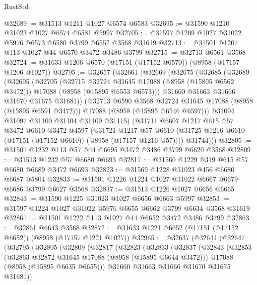 \begin{lexlean}{RustStd}
\begin{coremodule}
@32689 := @31513 @1211 @1027 @6574 @6583
@32695 := @31590 @1210 @31023 @1027 @6574 @6581 @5997
@32705 := @31597 @1209 @1027 @31022 @5976 @6573 @6580 @3799 @6552 @3568 @31619
@32713 := @31501 @1207 @113 @1027 @44 @6570 @3472 @3486 @3799
@32715 := @32713 @6561 @3568
@32724 := @31633 @1206 @6570 (@17151 (@17152 @6570)) (@8958 (@17157 @1206 @1027))
@32795 := @32657
    (@32661
      (@32669
        (@32675
          (@32685
            (@32689
              (@32695
                (@32705
                  (@32715 @32724 @31645 @17088 (@8958 (@15895 @6562 @3472)))
                  @17088
                  (@8958 (@15895 @6553 @6573)))
                @31660
                @31663
                @31666
                @31670
                @31675
                @31681))
            (@32713 @6590 @3568 @32724 @31645 @17088 (@8958 (@15895 @6591 @3472)))
            @17088
            (@8958 (@15895 @6546 @6597)))
          @31094
          @31097
          @31100
          @31104
          @31109
          @31115)
        (@31711
          @6607
          @1217
          @615
          @57
          @3472
          @6610
          @3472
          @4597
          (@31721
            @1217
            @57
            @6610
            (@31725 @1216 @6610 (@17151 (@17152 @6610)) (@8958 (@17157 @1216 @57))))
          @31744)))
@32805 := @31501 @1232 @113 @57 @44 @6695 @3472 @3486 @3799 @6620 @3568
@32809 := @31513 @1232 @57 @6680 @6693
@32817 := @31560 @1229 @319 @615 @57 @6680 @6689 @3472 @6693
@32823 := @31569 @1228 @31023 @456 @6680 @6687 @5804
@32833 := @31501 @1226 @1224 @1027 @31022 @6667 @6679 @6686 @3799 @6627 @3568
@32837 := @31513 @1226 @1027 @6656 @6665
@32843 := @31590 @1225 @31023 @1027 @6656 @6663 @5997
@32853 := @31597 @1224 @1027 @31022 @5976 @6655 @6662 @3799 @6634 @3568 @31619
@32861 := @31501 @1222 @113 @1027 @44 @6652 @3472 @3486 @3799
@32863 := @32861 @6643 @3568
@32872 := @31633 @1221 @6652 (@17151 (@17152 @6652)) (@8958 (@17157 @1221 @1027))
@32965 := @32637
    (@32641
      (@32647
        (@32795
          (@32805
            (@32809
              (@32817
                (@32823
                  (@32833
                    (@32837
                      (@32843
                        (@32853
                          (@32863 @32872 @31645 @17088 (@8958 (@15895 @6644 @3472)))
                          @17088
                          (@8958 (@15895 @6635 @6655)))
                        @31660
                        @31663
                        @31666
                        @31670
                        @31675
                        @31681))

\end{coremodule}
\end{lexlean}

